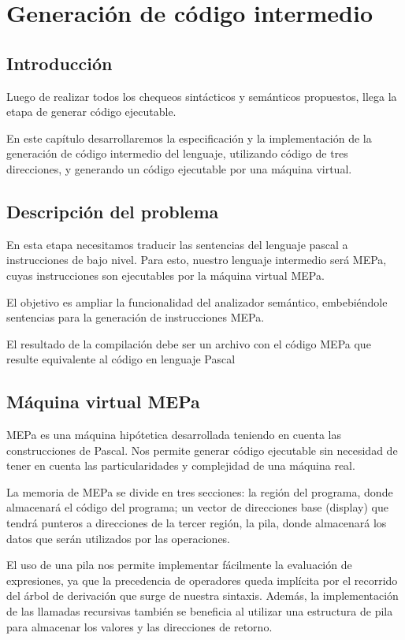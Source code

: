 \chapter{Generación de código intermedio}

\section{Introducción}
Luego de realizar todos los chequeos sintácticos y semánticos propuestos, llega la etapa de generar código ejecutable.

En este capítulo desarrollaremos la especificación y la implementación de la generación de código intermedio del lenguaje, utilizando código de tres direcciones, y generando un código ejecutable por una máquina virtual.

\section{Descripción del problema}
\label{sec:gen_cod:descr_prob}
En esta etapa necesitamos traducir las sentencias del lenguaje pascal a instrucciones de bajo nivel. Para esto, nuestro lenguaje intermedio será MEPa, cuyas instrucciones son ejecutables por la máquina virtual MEPa. 

El objetivo es ampliar la funcionalidad del analizador semántico, embebiéndole sentencias para la generación de instrucciones MEPa.

El resultado de la compilación debe ser un archivo con el código MEPa que resulte equivalente al código en lenguaje Pascal

\section{Máquina virtual MEPa}
MEPa es una máquina hipótetica desarrollada teniendo en cuenta las construcciones de Pascal. Nos permite generar código ejecutable sin necesidad de tener en cuenta las particularidades y complejidad de una máquina real.

La memoria de MEPa se divide en tres secciones: la región del programa, donde almacenará el código del programa; un vector de direcciones base (display) que tendrá punteros a direcciones de la tercer región, la pila, donde almacenará los datos que serán utilizados por las operaciones. 

El uso de una pila nos permite implementar fácilmente la evaluación de expresiones, ya que la precedencia de operadores queda implícita por el recorrido del árbol de derivación que surge de nuestra sintaxis. Además, la implementación de las llamadas recursivas también se beneficia al utilizar una estructura de pila para almacenar los valores y las direcciones de retorno.

